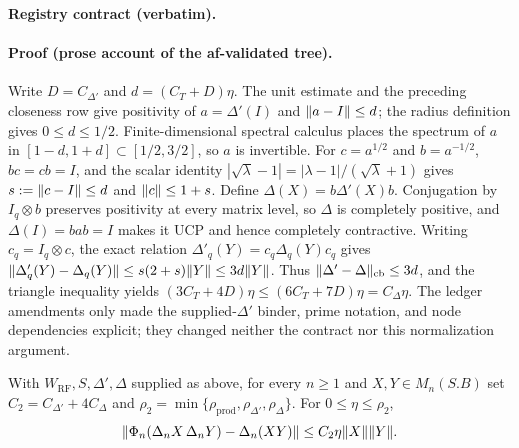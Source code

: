 \noindent\textbf{Registry contract (verbatim).}

\paragraph{Proof (prose account of the af-validated tree).}
Write $D=C_{\Delta'}$ and $d=(C_T+D)\eta$.  The unit estimate and the preceding
closeness row give positivity of $a=\Delta'(I)$ and $\lVert a-I\rVert\le d$; the radius definition
gives $0\le d\le1/2$.  Finite-dimensional spectral calculus places the spectrum of $a$ in
$[1-d,1+d]\subset[1/2,3/2]$, so $a$ is invertible.  For $c=a^{1/2}$ and $b=a^{-1/2}$,
$bc=cb=I$, and the scalar identity
$|\sqrt\lambda-1|=|\lambda-1|/(\sqrt\lambda+1)$ gives
$s:=\lVert c-I\rVert\le d$ and $\lVert c\rVert\le1+s$.  Define $\Delta(X)=b\Delta'(X)b$.
Conjugation by $I_q\otimes b$ preserves positivity at every matrix level, so $\Delta$ is
completely positive, and $\Delta(I)=bab=I$ makes it UCP and hence completely contractive.
Writing $c_q=I_q\otimes c$, the exact relation
$\Delta'_q(Y)=c_q\Delta_q(Y)c_q$ gives
$\lVert \Delta'_q(Y)-\Delta_q(Y)\rVert\le s(2+s)\lVert Y\rVert\le3d\lVert Y\rVert$.
Thus $\lVert \Delta'-\Delta\rVert_{\mathrm{cb}}\le3d$, and the triangle inequality yields
$(3C_T+4D)\eta\le(6C_T+7D)\eta=C_\Delta\eta$.
The ledger amendments only made the supplied-$\Delta'$ binder, prime notation, and node
dependencies explicit; they changed neither the contract nor this normalization argument.

\begin{lemma}\label{lem:routef-degree-two-estimate}
With $W_{\mathrm{RF}},S,\Delta',\Delta$ supplied as above, for every $n\ge1$ and
$X,Y\in M_n(S.B)$ set
$C_2=C_{\Delta'}+4C_\Delta$ and
$\rho_2=\min\{\rho_{\mathrm{prod}},\rho_{\Delta'},\rho_\Delta\}$.
For $0\le\eta\le\rho_2$,
\[
 \lVert \Phi_n(\Delta_nX\,\Delta_nY)-\Delta_n(XY)\rVert
 \le C_2\eta\lVert X\rVert\lVert Y\rVert .
\]
\end{lemma}

